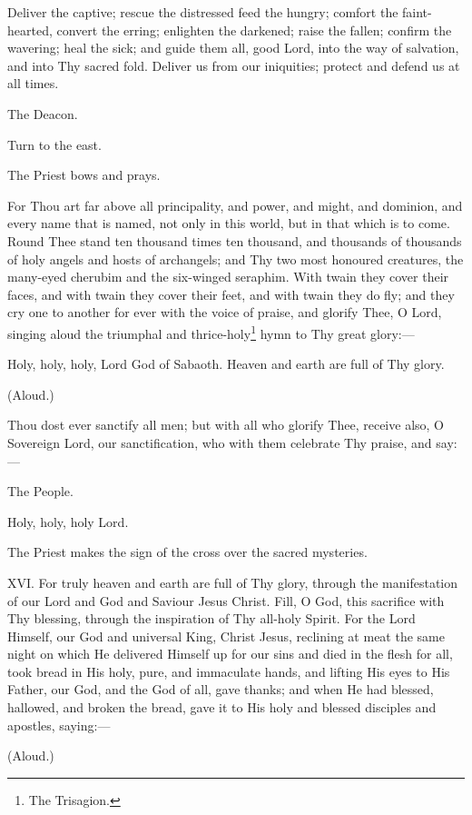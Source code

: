 Deliver the captive; rescue the distressed feed the hungry; comfort the faint-hearted, convert the erring; enlighten the darkened; raise the fallen; confirm the wavering; heal the sick; and guide them all, good Lord, into the way of salvation, and into Thy sacred fold. Deliver us from our iniquities; protect and defend us at all times.

The Deacon.

Turn to the east.

The Priest bows and prays.

For Thou art far above all principality, and power, and might, and dominion, and every name that is named, not only in this world, but in that which is to come. Round Thee stand ten thousand times ten thousand, and thousands of thousands of holy angels and hosts of archangels; and Thy two most honoured creatures, the many-eyed cherubim and the six-winged seraphim. With twain they cover their faces, and with twain they cover their feet, and with twain they do fly; and they cry one to another for ever with the voice of praise, and glorify Thee, O Lord, singing aloud the triumphal and thrice-holy\footnote{\par  The Trisagion.} hymn to Thy great glory:—

Holy, holy, holy, Lord God of Sabaoth. Heaven and earth are full of Thy glory.

(Aloud.)

Thou dost ever sanctify all men; but with all who glorify Thee, receive also, O Sovereign Lord, our sanctification, who with them celebrate Thy praise, and say:—

The People.

Holy, holy, holy Lord.

The Priest makes the sign of the cross over the sacred mysteries.

XVI. For truly heaven and earth are full of Thy glory, through the manifestation of our Lord and God and Saviour Jesus Christ. Fill, O God, this sacrifice with Thy blessing, through the inspiration of Thy all-holy Spirit. For the Lord Himself, our God and universal King, Christ Jesus, reclining at meat the same night on which He delivered Himself up for our sins and died in the flesh for all, took bread in His holy, pure, and immaculate hands, and lifting His eyes to His Father, our God, and the God of all, gave thanks; and when He had blessed, hallowed, and broken the bread, gave it to His holy and blessed disciples and apostles, saying:—

(Aloud.)

